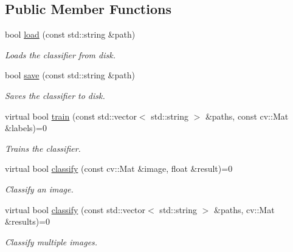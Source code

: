 \subsection*{Public Member Functions}
\begin{DoxyCompactItemize}
\item 
bool \hyperlink{classBOWClassifier_adcf5bbbd1c4177853601fa3f984ae491}{load} (const std::string \&path)
\begin{DoxyCompactList}\small\item\em Loads the classifier from disk. \item\end{DoxyCompactList}\item 
bool \hyperlink{classBOWClassifier_a474e4942af78f65125f15ad13924a3c4}{save} (const std::string \&path)
\begin{DoxyCompactList}\small\item\em Saves the classifier to disk. \item\end{DoxyCompactList}\item 
virtual bool \hyperlink{classBOWClassifier_a8a00f5cadf166f361a411d5a4e67b4d6}{train} (const std::vector$<$ std::string $>$ \&paths, const cv::Mat \&labels)=0
\begin{DoxyCompactList}\small\item\em Trains the classifier. \item\end{DoxyCompactList}\item 
virtual bool \hyperlink{classBOWClassifier_a63bff22f5005e1b79d9c4cd5e7a57748}{classify} (const cv::Mat \&image, float \&result)=0
\begin{DoxyCompactList}\small\item\em Classify an image. \item\end{DoxyCompactList}\item 
virtual bool \hyperlink{classBOWClassifier_a0785d39115372051816210d8d2c0335e}{classify} (const std::vector$<$ std::string $>$ \&paths, cv::Mat \&results)=0
\begin{DoxyCompactList}\small\item\em Classify multiple images. \item\end{DoxyCompactList}\end{DoxyCompactItemize}
